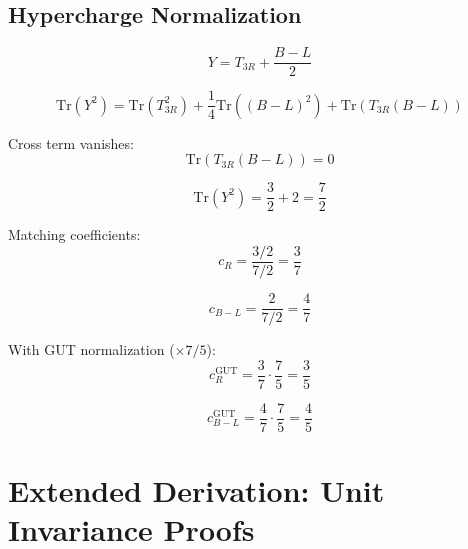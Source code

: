 \documentclass[11pt,a4paper]{article}
\theoremstyle{definition}
\begin{document}
\subsection{Hypercharge Normalization}
\label{subsec:hyper_norm}

\begin{equation}
\label{eq:hyper_1}
Y = T_{3R} + \frac{B-L}{2}
\end{equation}

\begin{equation}
\label{eq:hyper_2}
\text{Tr}(Y^2) = \text{Tr}(T_{3R}^2) + \frac{1}{4}\text{Tr}((B-L)^2) + \text{Tr}(T_{3R}(B-L))
\end{equation}

Cross term vanishes:
\begin{equation}
\label{eq:hyper_3}
\text{Tr}(T_{3R}(B-L)) = 0
\end{equation}

\begin{equation}
\label{eq:hyper_4}
\text{Tr}(Y^2) = \frac{3}{2} + 2 = \frac{7}{2}
\end{equation}

Matching coefficients:
\begin{equation}
\label{eq:hyper_5}
c_R = \frac{3/2}{7/2} = \frac{3}{7}
\end{equation}

\begin{equation}
\label{eq:hyper_6}
c_{B-L} = \frac{2}{7/2} = \frac{4}{7}
\end{equation}

With GUT normalization ($\times 7/5$):
\begin{equation}
\label{eq:hyper_7}
c_R^{\text{GUT}} = \frac{3}{7}\cdot\frac{7}{5} = \frac{3}{5}
\end{equation}

\begin{equation}
\label{eq:hyper_8}
c_{B-L}^{\text{GUT}} = \frac{4}{7}\cdot\frac{7}{5} = \frac{4}{5}
\end{equation}

\section{Extended Derivation: Unit Invariance Proofs}
\label{app:unit_proofs}
\end{document}
